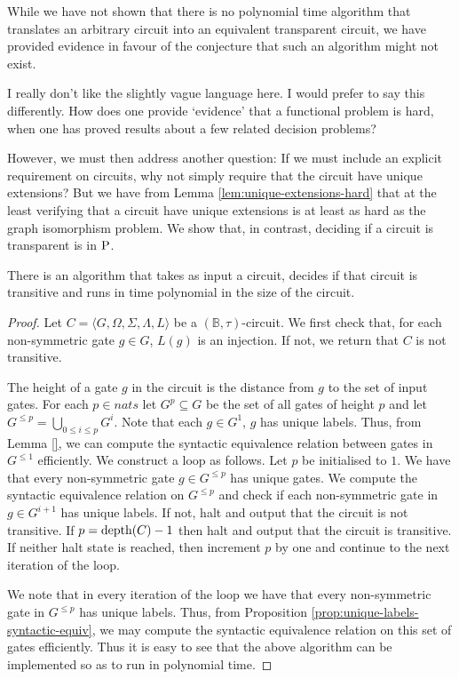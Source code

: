 \documentclass[../paper.tex]{subfiles}
\begin{document}
While we have not shown that there is no polynomial time algorithm that
translates an arbitrary circuit into an equivalent transparent circuit, we have
provided evidence in favour of the conjecture that such an algorithm might not
exist.

\begin{remark}
  I really don't like the slightly vague language here. I would prefer to say
  this differently. How does one provide `evidence' that a functional problem is
  hard, when one has proved results about a few related decision problems?
\end{remark}

However, we must then address another question: If we must include an explicit
requirement on circuits, why not simply require that the circuit have unique
extensions? But we have from Lemma \ref{lem:unique-extensions-hard} that at the
least verifying that a circuit have unique extensions is at least as hard as the
graph isomorphism problem. We show that, in contrast, deciding if a circuit is
transparent is in $\mathrm{P}$.

\begin{prop}
  There is an algorithm that takes as input a circuit, decides if that circuit
  is transitive and runs in time polynomial in the size of the circuit.
  \label{prop:tansitive-polynomial-time}
\end{prop}
\begin{proof}
  Let $C = \langle G, \Omega, \Sigma, \Lambda, L \rangle$ be a $(\mathbb{B},
  \tau)$-circuit. We first check that, for each non-symmetric gate $g \in G$,
  $L(g)$ is an injection. If not, we return that $C$ is not transitive.

  The height of a gate $g$ in the circuit is the distance from $g$ to the set of
  input gates. For each $p \in nats$ let $G^p \subseteq G$ be the set of all
  gates of height $p$ and let $G^{\leq p} = \bigcup_{0 \leq i \leq p}G^i$. Note
  that each $g \in G^1$, $g$ has unique labels. Thus, from Lemma \ref{}, we can
  compute the syntactic equivalence relation between gates in $G^{\leq 1}$
  efficiently. We construct a loop as follows. Let $p$ be initialised to $1$. We
  have that every non-symmetric gate $g \in G^{\leq p}$ has unique gates. We
  compute the syntactic equivalence relation on $G^{\leq p}$ and check if each
  non-symmetric gate in $g \in G^{i + 1}$ has unique labels. If not, halt and
  output that the circuit is not transitive. If $p = \text{depth}(C) -1$ then halt and
  output that the circuit is transitive. If neither halt state is reached, then
  increment $p$ by one and continue to the next iteration of the loop.

  We note that in every iteration of the loop we have that every non-symmetric
  gate in $G^{\leq p}$ has unique labels. Thus, from Proposition
  \ref{prop:unique-labels-syntactic-equiv}, we may compute the syntactic
  equivalence relation on this set of gates efficiently. Thus it is easy to see
  that the above algorithm can be implemented so as to run in polynomial time.
\end{proof}
\end{document}
